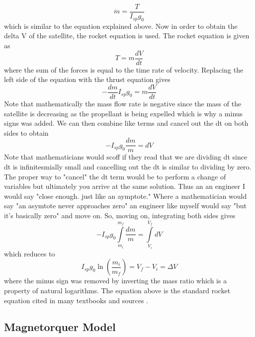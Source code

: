 \begin{equation}
  \dot{m} = \frac{T}{I_{sp}g_0}
\end{equation}
which is similar to the equation explained above. Now in order to obtain the delta V of the satellite, the rocket equation is used. The rocket equation is given as 
\begin{equation}
  T = m\frac{dV}{dt}
\end{equation}
where the sum of the forces is equal to the time rate of velocity. Replacing the left side of the equation with the thrust equation gives
\begin{equation}
  -\frac{dm}{dt}I_{sp}g_0 = m\frac{dV}{dt}
\end{equation}
Note that mathematically the mass flow rate is negative since the mass of the satellite is decreasing as the propellant is being expelled which is why a minus signs was added. We can then combine like terms and cancel out the dt on both sides to obtain
\begin{equation}
  -I_{sp}g_0\frac{dm}{m} = dV
\end{equation}
Note that mathematicians would scoff if they read that we are dividing dt since dt is infinitesmially small and cancelling out the dt is similar to dividing by zero. The proper way to "cancel" the dt term would be to perform a change of variables but ultimately you arrive at the same solution. Thus an an engineer I would say "close enough. just like an aymptote." Where a mathematician would say "an asymtote never approaches zero" an engineer like myself would say "but it's basically zero" and move on. So, moving on, integrating both sides gives
\begin{equation}
  -I_{sp}g_0\int\limits_{m_i}^{m_f}\frac{dm}{m} = \int\limits_{V_i}^{V_f}dV
\end{equation}
which reduces to
\begin{equation}
  I_{sp}g_0\ln\left(\frac{m_i}{m_f}\right) = V_f - V_i = \Delta V
\end{equation}
where the minus sign was removed by inverting the mass ratio which is a property of natural logarithms. The equation above is the standard rocket equation cited in many textbooks and sources \cite{qp8,qp9}.

\subsection{Magnetorquer Model}

